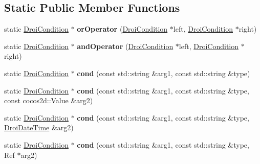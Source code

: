 \subsection*{Static Public Member Functions}
\begin{DoxyCompactItemize}
\item 
\mbox{\label{class_droi_condition_afd802eeb181d0c1e4874c623edeba60e}} 
static \hyperlink{class_droi_condition}{Droi\+Condition} $\ast$ {\bfseries or\+Operator} (\hyperlink{class_droi_condition}{Droi\+Condition} $\ast$left, \hyperlink{class_droi_condition}{Droi\+Condition} $\ast$right)
\item 
\mbox{\label{class_droi_condition_a03bd023f773779123a3580dc0038efc6}} 
static \hyperlink{class_droi_condition}{Droi\+Condition} $\ast$ {\bfseries and\+Operator} (\hyperlink{class_droi_condition}{Droi\+Condition} $\ast$left, \hyperlink{class_droi_condition}{Droi\+Condition} $\ast$right)
\item 
\mbox{\label{class_droi_condition_ad5f1b375a9e8d3b64c05858fa0c73c46}} 
static \hyperlink{class_droi_condition}{Droi\+Condition} $\ast$ {\bfseries cond} (const std\+::string \&arg1, const std\+::string \&type)
\item 
\mbox{\label{class_droi_condition_a8b2281be59deb44d5a2dc3904d034637}} 
static \hyperlink{class_droi_condition}{Droi\+Condition} $\ast$ {\bfseries cond} (const std\+::string \&arg1, const std\+::string \&type, const cocos2d\+::\+Value \&arg2)
\item 
\mbox{\label{class_droi_condition_af0304abdf3cf86810bf9cc614c7aeb12}} 
static \hyperlink{class_droi_condition}{Droi\+Condition} $\ast$ {\bfseries cond} (const std\+::string \&arg1, const std\+::string \&type, \hyperlink{class_droi_date_time}{Droi\+Date\+Time} \&arg2)
\item 
\mbox{\label{class_droi_condition_aa8d51983f7dbaee69dfa3b4d672f6f2a}} 
static \hyperlink{class_droi_condition}{Droi\+Condition} $\ast$ {\bfseries cond} (const std\+::string \&arg1, const std\+::string \&type, Ref $\ast$arg2)
\item 
\mbox{\label{class_droi_condition_a78c9bfca07bb36edafc53cfeb4feb33c}} 

\end{DoxyCompactItemize}
